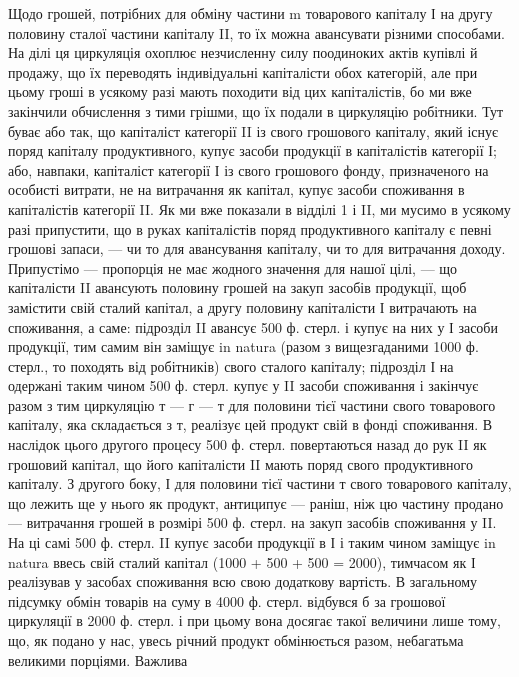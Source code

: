 Щодо грошей, потрібних для обміну частини m товарового капіталу
І на другу половину сталої частини капіталу II, то їх можна авансувати
різними способами. На ділі ця циркуляція охоплює незчисленну силу поодиноких
актів купівлі й продажу, що їх переводять індивідуальні капіталісти
обох категорій, але при цьому гроші в усякому разі мають походити
від цих капіталістів, бо ми вже закінчили обчислення з тими
грішми, що їх подали в циркуляцію робітники. Тут буває або так, що
капіталіст категорії II із свого грошового капіталу, який існує поряд капіталу
продуктивного, купує засоби продукції в капіталістів категорії І;
або, навпаки, капіталіст категорії І із свого грошового фонду, призначеного
на особисті витрати, не на витрачання як капітал, купує засоби
споживання в капіталістів категорії II. Як ми вже показали в відділі 1 і
II, ми мусимо в усякому разі припустити, що в руках капіталістів поряд
продуктивного капіталу є певні грошові запаси, — чи то для авансування
капіталу, чи то для витрачання доходу. Припустімо — пропорція не має
жодного значення для нашої цілі, — що капіталісти II авансують половину
грошей на закуп засобів продукції, щоб замістити свій сталий капітал,
а другу половину капіталісти І витрачають на споживання, а саме: підрозділ
II авансує 500 ф. стерл. і купує на них у І засоби продукції,
тим самим він заміщує in natura (разом з вищезгаданими 1000 ф. стерл.,
то походять від робітників)  свого сталого капіталу; підрозділ І на
одержані таким чином 500 ф. стерл. купує у II засоби споживання
і закінчує разом з тим циркуляцію т — г — т для половини тієї частини
свого товарового капіталу, яка складається з т, реалізує цей продукт
свій в фонді споживання. В наслідок цього другого процесу 500 ф. стерл.
повертаються назад до рук II як грошовий капітал, що його капіталісти
II мають поряд свого продуктивного капіталу. З другого боку, І для
половини тієї частини т свого товарового капіталу, що лежить ще у
нього як продукт, антиципує — раніш, ніж цю частину продано — витрачання
грошей в розмірі 500 ф. стерл. на закуп засобів споживання у II.
На ці самі 500 ф. стерл. II купує засоби продукції в І і таким чином
заміщує in natura ввесь свій сталий капітал (1000 + 500 + 500 = 2000),
тимчасом як І реалізував у засобах споживання всю свою додаткову
вартість. В загальному підсумку обмін товарів на суму в 4000 ф. стерл.
відбувся б за грошової циркуляції в 2000 ф. стерл. і при цьому вона
досягає такої величини лише тому, що, як подано у нас, увесь річний
продукт обмінюється разом, небагатьма великими порціями. Важлива
